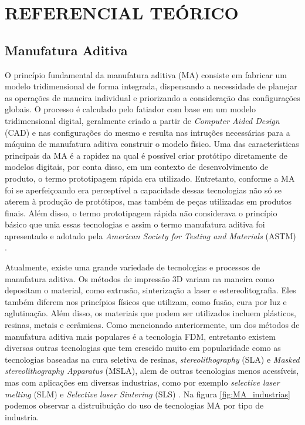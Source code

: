 \chapter{REFERENCIAL TEÓRICO}

\section{Manufatura Aditiva}
O princípio fundamental da manufatura aditiva (MA) consiste em fabricar um modelo tridimensional de forma 
integrada, dispensando a necessidade de planejar as operações de maneira individual e priorizando a 
consideração das configurações globais.
O processo é calculado pelo fatiador com base em um modelo tridimensional digital,
geralmente criado a partir de \textit{Computer Aided Design} (CAD) e nas configurações do mesmo
e resulta nas intruções necessárias para a máquina de manufatura aditiva construir o modelo físico.
Uma das características 
principais da MA é a rapidez na qual é possível criar protótipo
diretamente de modelos digitais, por conta disso, em um contexto 
de desenvolvimento de produto, o termo prototipagem rápida era 
utilizado. Entretanto, conforme a MA foi se aperfeiçoando era 
perceptível a capacidade dessas tecnologias não só se aterem à 
produção de protótipos, mas também de peças utilizadas em 
produtos finais. Além disso, o termo prototipagem rápida não considerava o princípio 
básico que unia essas tecnologias e assim o termo manufatura 
aditiva foi apresentado e adotado pela \textit{American Society for 
Testing and Materials} (ASTM) \cite{gibson15}.

Atualmente, existe uma grande variedade de tecnologias e processos de manufatura aditiva.
Os métodos de impressão 3D variam na maneira como depositam o material, como extrusão, sinterização a 
laser e estereolitografia. Eles também diferem nos princípios físicos que utilizam, como fusão, cura por luz
e aglutinação. Além disso, os materiais que podem ser utilizados incluem plásticos, resinas, metais e cerâmicas. 
Como mencionado anteriormente, um dos métodos de manufatura aditiva mais populares
é a tecnologia FDM, entretanto existem diversas outras tecnologias que tem crescido muito em popularidade
como as tecnologias baseadas na cura seletiva de resinas, \textit{stereolithography} (SLA) e \textit{Masked stereolithography Apparatus} (MSLA),
alem de outras tecnologias menos acessíveis, mas com aplicações em diversas industrias, como por exemplo
\textit{selective laser melting} (SLM) e \textit{Selective laser Sintering} (SLS) \cite{bikas16}.  
Na figura \ref{fig:MA_industrias} podemos observar a distruibuição do uso de 
tecnologias MA por tipo de industria.   

